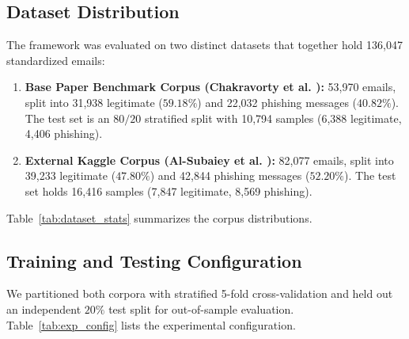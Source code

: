\documentclass[conference]{IEEEtran}
\begin{document}
\subsection{Dataset Distribution}
The framework was evaluated on two distinct datasets that together hold 136,047 standardized emails:
\begin{enumerate}
    \item \textbf{Base Paper Benchmark Corpus (Chakravorty et al. \cite{chakravorty2026}):} 53,970 emails, split into 31,938 legitimate ($59.18\%$) and 22,032 phishing messages ($40.82\%$). The test set is an $80/20$ stratified split with 10,794 samples (6,388 legitimate, 4,406 phishing).
    \item \textbf{External Kaggle Corpus (Al-Subaiey et al. \cite{alsubaiey2024}):} 82,077 emails, split into 39,233 legitimate ($47.80\%$) and 42,844 phishing messages ($52.20\%$). The test set holds 16,416 samples (7,847 legitimate, 8,569 phishing).
\end{enumerate}

Table~\ref{tab:dataset_stats} summarizes the corpus distributions.

\begin{table}[!t]
\caption{Dataset Statistics Across Evaluated Corpora.}
\label{tab:dataset_stats}
\centering\footnotesize
{}
\end{table}

\subsection{Training and Testing Configuration}
We partitioned both corpora with stratified 5-fold cross-validation and held out an independent $20\%$ test split for out-of-sample evaluation. Table~\ref{tab:exp_config} lists the experimental configuration.
\end{document}
